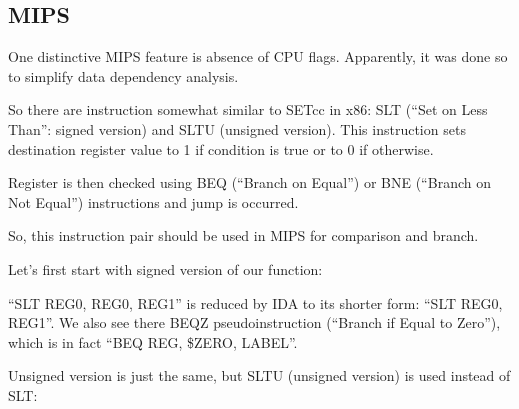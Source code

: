 ﻿\ifx\RUSSIAN\undefined
\subsection{MIPS}

One distinctive MIPS feature is absence of CPU flags.
Apparently, it was done so to simplify data dependency analysis.

So there are instruction somewhat similar to SETcc in x86: SLT (``Set on Less Than'': signed version) and 
SLTU (unsigned version).
This instruction sets destination register value to 1 if condition is true or to 0 if otherwise.

Register is then checked using BEQ (``Branch on Equal'') or BNE (``Branch on Not Equal'') 
instructions and jump is occurred.

So, this instruction pair should be used in MIPS for comparison and branch.

Let's first start with signed version of our function:



``SLT REG0, REG0, REG1'' is reduced by IDA to its shorter form: ``SLT REG0, REG1''.
We also see there BEQZ pseudoinstruction (``Branch if Equal to Zero''), 
which is in fact ``BEQ REG, \$ZERO, LABEL''.

Unsigned version is just the same, but SLTU (unsigned version) is used instead of SLT:



\fi
